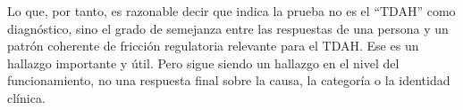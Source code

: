 \documentclass[11pt,a4paper]{article}
\begin{document}
Lo que, por tanto, es razonable decir que indica la prueba no es el \enquote{TDAH} como diagnóstico, sino el grado de semejanza entre las respuestas de una persona y un patrón coherente de fricción regulatoria relevante para el TDAH. Ese es un hallazgo importante y útil. Pero sigue siendo un hallazgo en el nivel del funcionamiento, no una respuesta final sobre la causa, la categoría o la identidad clínica.

\printbibliography
\end{document}

